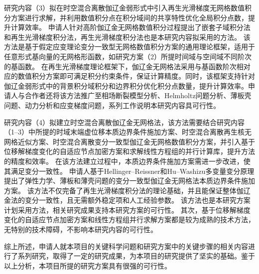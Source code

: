 研究内容（3）拟在时空混合离散伽辽金弱形式中引入再生光滑梯度无网格数值积分方案进行求解，并利用数值积分点在积分域间的共享特性优化全局积分点数，提升计算效率。
申请人针对高阶伽辽金无网格数值积分过程提出了嵌套子域积分法\cite{wang2016b}和再生光滑梯度积分法\cite{wang2019a}，再生光滑梯度积分法也是本研究内容拟采用的方法。
该方法是基于假定应变理论变分一致型无网格数值积分方案的通用理论框架，适用于任意形式基向量的无网格形函数，如研究方案（2）所提时间域与空间域不同阶次的基函数。
在再生光滑梯度理论框架下，伽辽金无网格法采用与基函数阶次相对应的数值积分方案即可满足积分约束条件，保证计算精度。同时，该框架支持针对伽辽金弱形式中的背景积分域积分和边界积分优化积分点数量，提升计算效率。申请人与合作者还将该方法推广至相场断裂模型分析\cite{wu2020a}、Helmholtz问题分析\cite{wang2020b}、薄板壳问题\cite{wu2023,wu2024}、动力分析\cite{Fu2022}和应变梯度问题\cite{du2022}，系列工作说明本研究内容具可行性。

研究内容（4）拟建立时空混合离散伽辽金无网格法，该方法需要结合研究内容（1--3）中所提的时域末端虚位移本质边界条件施加方案、时空混合离散再生核无网格近似方案、时空混合离散变分一致型伽辽金无网格数值积分方案，并引入基于位移解梯度变化的自适应节点加密方案和求解线性方程组的并行计算库，提升方法的精度和效率。
在该方法建立过程中，本质边界条件施加方案需进一步改进，使其满足变分一致性。
申请人基于Hellinger--Reissner和Hu--Washizu多变量变分原理提出了弹性力学、薄板和薄壳问题的变分一致型伽辽金无网格法本质边界条件施加方案\cite{Wu2022b,wu2023,wu2024}。
该方法不仅完备了再生光滑梯度积分法的理论基础，并且能保证整体伽辽金法的变分一致性，且无需额外稳定项和人工经验参数。
该方法也是本研究方案计划采用方法，相关研究成果支持本研究方案的可行性。
其次，基于位移解梯度变化的自适应节点加密方案和线性方程组并行求解方案都是较为成熟的技术方法，无特别的技术障碍，不影响本研究内容的可行性。

综上所述，申请人就本项目的关键科学问题和研究方案中的关键步骤的相关内容进行了系列研究，取得了一定的研究成果，为本项目的研究提供了坚实的基础。鉴于以上分析，本项目所提的研究方案具有很强的可行性。

\newpage